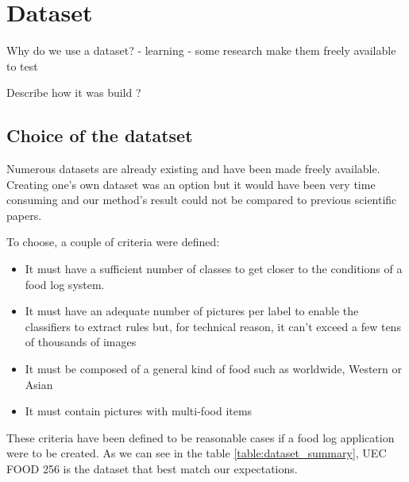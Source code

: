 \chapter{Dataset}  \label{sec:dataset}

Why do we use a dataset?
- learning
- some research make them freely available to test

Describe how it was build ?

\section{Choice of the datatset}

Numerous datasets are already existing and have been made freely available. Creating one's own dataset was an option but it would have been very time consuming and our method's result could not be compared to previous scientific papers.

To choose, a couple of criteria were defined:
\begin{itemize}
    \item It must have a sufficient number of classes to get closer to the conditions of a food log system.
    \item It must have an adequate number of pictures per label to enable the classifiers to extract rules but, for technical reason, it can't exceed a few tens of thousands of images
    \item It must be composed of a general kind of food such as worldwide, Western or Asian
    \item It must contain pictures with multi-food items
\end{itemize}

These criteria have been defined to be reasonable cases if a food log application were to be created.
As we can see in the table \ref{table:dataset_summary}, UEC FOOD 256 is the dataset that best match our expectations.

